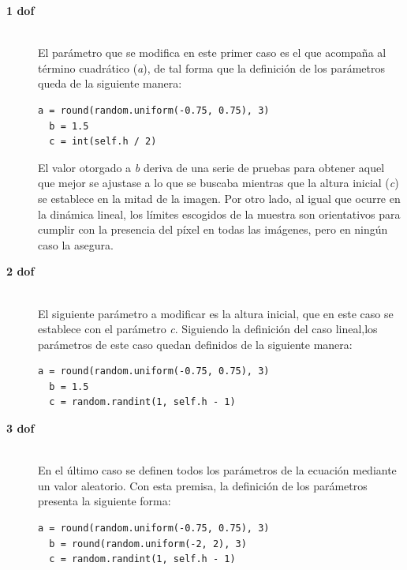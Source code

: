 \begin{description}
\item[\textbf{1 \acrshort{dof}}] \hfill 
\vspace{10pt}
\\
El parámetro que se modifica en este primer caso es el que acompaña al término cuadrático (\textit{a}), de tal forma que la definición de los parámetros queda de la siguiente manera: 
\vspace{10pt}
\begin{lstlisting}[frame=single]
  a = round(random.uniform(-0.75, 0.75), 3)
  b = 1.5
  c = int(self.h / 2)
\end{lstlisting}
El valor otorgado a \textit{b} deriva de una serie de pruebas para obtener aquel que mejor se ajustase a lo que se buscaba mientras que la altura inicial (\textit{c}) se establece en la mitad de la imagen. Por otro lado, al igual que ocurre en la dinámica lineal, los límites escogidos de la muestra son orientativos para cumplir con la presencia del píxel en todas las imágenes, pero en ningún caso la asegura. 
\vspace{10pt}
\item[\textbf{2 \acrshort{dof}}] \hfill 
\vspace{10pt}
\\
El siguiente parámetro a modificar es la altura inicial, que en este caso se establece con el parámetro \textit{c}. Siguiendo la definición del caso lineal,los parámetros de este caso quedan definidos de la siguiente manera:
\vspace{10pt}
\begin{lstlisting}[frame=single]
  a = round(random.uniform(-0.75, 0.75), 3)
  b = 1.5
  c = random.randint(1, self.h - 1)
\end{lstlisting}
\vspace{10pt}

\item[\textbf{3 \acrshort{dof}}] \hfill 
\vspace{10pt}
\\
En el último caso se definen todos los parámetros de la ecuación mediante un valor aleatorio. Con esta premisa, la definición de los parámetros presenta la siguiente forma:
\vspace{40pt}
\begin{lstlisting}[frame=single]
  a = round(random.uniform(-0.75, 0.75), 3)
  b = round(random.uniform(-2, 2), 3)
  c = random.randint(1, self.h - 1)
\end{lstlisting}
\vspace{10pt}

\end{description}

